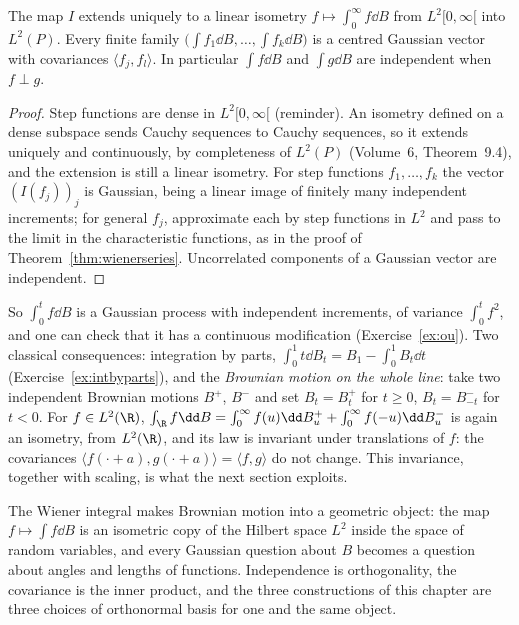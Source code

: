 \begin{theorem}\label{thm:wienerint}
The map $I$ extends uniquely to a linear isometry $f\mapsto\int_0^\infty f\dd B$ from $L^2[0,\infty[$ into $L^2(P)$. Every finite family $\bigl(\int f_1\dd B,\dots,\int f_k\dd B\bigr)$ is a centred Gaussian vector with
covariances $\langle f_j,f_l\rangle$. In particular $\int f\dd B$ and $\int g\dd B$ are independent when $f\perp g$.
\end{theorem}

\begin{proof}
Step functions are dense in $L^2[0,\infty[$ (reminder). An isometry defined on a dense subspace sends Cauchy sequences to Cauchy sequences, so it extends uniquely and continuously, by completeness of $L^2(P)$
(Volume~6, Theorem~9.4), and the extension is still a linear isometry. For step functions $f_1,\dots,f_k$ the vector $(I(f_j))_j$ is Gaussian, being a linear image of finitely many independent increments; for general
$f_j$, approximate each by step functions in $L^2$ and pass to the limit in the characteristic functions, as in the proof of Theorem~\ref{thm:wienerseries}. Uncorrelated components of a Gaussian vector are
independent.
\end{proof}

So $\int_0^tf\dd B$ is a Gaussian process with independent increments, of variance $\int_0^tf^2$, and one can check that it has a continuous modification (Exercise~\ref{ex:ou}). Two classical consequences:
integration by parts, $\int_0^1t\dd B_t=B_1-\int_0^1B_t\dd t$ (Exercise~\ref{ex:intbyparts}), and the \emph{Brownian motion on the whole line}: take two independent Brownian motions $B^+$, $B^-$ and set
$B_t=B^+_t$ for $t\ge0$, $B_t=B^-_{-t}$ for $t<0$. For $f\in L^2(\R)$, $\int_\R f\dd B=\int_0^\infty f(u)\dd B^+_u+\int_0^\infty f(-u)\dd B^-_u$ is again an isometry, from $L^2(\R)$, and its law is invariant under
translations of $f$: the covariances $\langle f(\cdot+a),g(\cdot+a)\rangle=\langle f,g\rangle$ do not change. This invariance, together with scaling, is what the next section exploits.

\begin{beauty}
The Wiener integral makes Brownian motion into a geometric object: the map $f\mapsto\int f\dd B$ is an isometric copy of the Hilbert space $L^2$ inside the space of random variables, and every Gaussian question
about $B$ becomes a question about angles and lengths of functions. Independence is orthogonality, the covariance is the inner product, and the three constructions of this chapter are three choices of orthonormal
basis for one and the same object.
\end{beauty}

